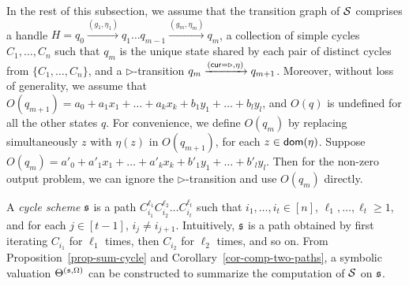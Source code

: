 In the rest of this subsection, we assume that the transition graph of ${\mathcal{S} }$ comprises a handle $H=q_0 \xrightarrow{(g_1,\eta_1)} q_1 \dots q_{m-1} \xrightarrow{(g_m,\eta_m)} q_{m}$, a collection of simple cycles $C_1,\dots,C_n$ such that $q_m$ is the unique state shared by each pair of distinct cycles from $\{C_1,\dots,C_n\}$, and a $\triangleright$-transition $q_m \xrightarrow{(\mathsf{cur} = \triangleright, \eta)} q_{m+1}$. Moreover, without loss of generality, we assume that $O(q_{m+1}) = a_0 + a_1 x_1 + \dots + a_k x_k + b_1 y_1 + \dots + b_l y_l$, and $O(q)$ is undefined for all the other states $q$. For convenience, we define $O(q_m)$ by replacing simultaneously $z$ with $\eta(z)$ in $O(q_{m+1})$,  for each $z \in \mathsf{dom}(\eta)$. Suppose $O(q_m) = a'_0 + a'_1 x_1 + \dots + a'_k x_k + b'_1 y_1 + \dots + b'_l y_l$. Then for the non-zero output problem, we can ignore the $\triangleright$-transition and use $O(q_m)$  directly.

A \emph{cycle scheme} ${\mathfrak{s} }$ is a path $C_{i_1}^{\ell_1} C_{i_2}^{\ell_2} \dots C_{i_t}^{\ell_t}$ such that $i_1,\dots,i_t \in [n]$, $\ell_1,\dots, \ell_t \ge 1$, and for each $j\in [t-1]$, $i_j \neq i_{j+1}$. Intuitively, ${\mathfrak{s} }$ is a path obtained by first iterating $C_{i_1}$ for $\ell_1$ times, then $C_{i_2}$ for $\ell_2$ times, and so on. From Proposition~\ref{prop-sum-cycle} and Corollary~\ref{cor-comp-two-paths}, a symbolic valuation $\Theta^{({\mathfrak{s} },\Omega)}$ can be constructed 
to summarize the computation of ${\mathcal{S} }$ on ${\mathfrak{s} }$. 


